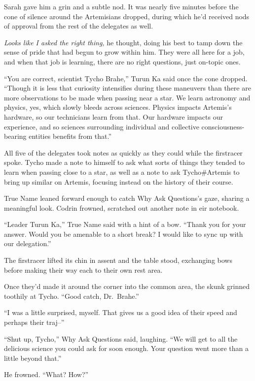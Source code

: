 Sarah gave him a grin and a subtle nod. It was nearly five minutes before the cone of silence around the Artemisians dropped, during which he'd received nods of approval from the rest of the delegates as well.

\emph{Looks like I asked the right thing,} he thought, doing his best to tamp down the sense of pride that had begun to grow within him. They were all here for a job, and when that job is learning, there are no right questions, just on-topic ones.

``You are correct, scientist Tycho Brahe,'' Turun Ka said once the cone dropped. ``Though it is less that curiosity intensifies during these maneuvers than there are more observations to be made when passing near a star. We learn astronomy and physics, yes, which slowly bleeds across sciences. Physics impacts Artemis's hardware, so our technicians learn from that. Our hardware impacts our experience, and so sciences surrounding individual and collective consciousness-bearing entities benefits from that.''

All five of the delegates took notes as quickly as they could while the firstracer spoke. Tycho made a note to himself to ask what sorts of things they tended to learn when passing close to a star, as well as a note to ask Tycho\#Artemis to bring up similar on Artemis, focusing instead on the history of their course.

True Name leaned forward enough to catch Why Ask Questions's gaze, sharing a meaningful look. Codrin frowned, scratched out another note in eir notebook.

``Leader Turun Ka,'' True Name said with a hint of a bow. ``Thank you for your answer. Would you be amenable to a short break? I would like to sync up with our delegation.''

The firstracer lifted its chin in assent and the table stood, exchanging bows before making their way each to their own rest area.

Once they'd made it around the corner into the common area, the skunk grinned toothily at Tycho. ``Good catch, Dr.~Brahe.''

``I was a little surprised, myself. That gives us a good idea of their speed and perhaps their traj--''

``Shut up, Tycho,'' Why Ask Questions said, laughing. ``We will get to all the delicious science you could ask for soon enough. Your question went more than a little beyond that.''

He frowned. ``What? How?''

